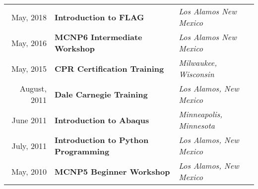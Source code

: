 
\begin{minipage}{\textwidth}
	\begin{tabular}{r|ll}
 		May, 2018 & \textbf{Introduction to FLAG} &  \textit{Los Alamos New Mexico}  \\
 		May, 2016 & \textbf{MCNP6 Intermediate Workshop} &  \textit{Los Alamos New Mexico}  \\
 		May, 2015 & \textbf{CPR Certification Training}  &  \textit{Milwaukee, Wisconsin}  \\
 		August, 2011 & \textbf{Dale Carnegie Training} & \textit{Los Alamos, New Mexico}  \\
 		June 2011 & \textbf{Introduction to Abaqus} & \textit{Minneapolis, Minnesota} \\
 		July, 2011 & \textbf{Introduction to Python Programming} & \textit{Los Alamos, New Mexico} \\
 		May, 2010 & \textbf{MCNP5 Beginner Workshop} & \textit{Los Alamos, New Mexico} \\
 	\end{tabular}
\end{minipage}
